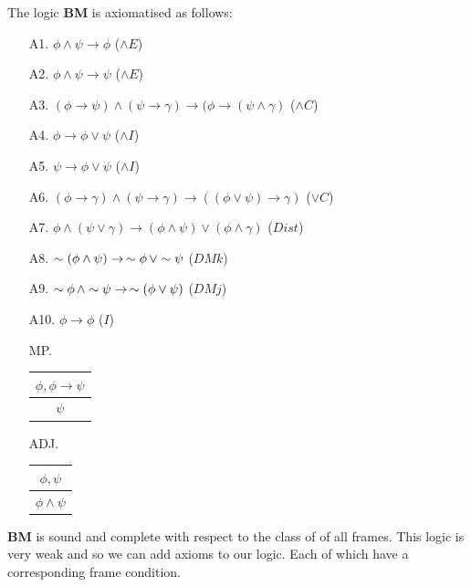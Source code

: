 \begin{definition}
    The logic \textbf{BM} is axiomatised as follows:
    \begin{enumerate}
        \item[A1.] $\phi \wedge \psi \to \phi$ \hfill ($\wedge E$)
        \item[A2.] $\phi \wedge \psi \to \psi$ \hfill ($\wedge E$)
        \item[A3.] $(\phi \to \psi) \wedge (\psi \to \gamma) \to (\phi \to (\psi\wedge\gamma)$ \hfill ($\wedge C$)
        \item[A4.] $\phi\to \phi\vee\psi$ \hfill ($\wedge I$)
        \item[A5.] $\psi\to \phi\vee\psi$ \hfill ($\wedge I$)
        \item[A6.] $(\phi \to \gamma) \wedge (\psi \to \gamma) \to ((\phi \vee \psi)\to\gamma)$ \hfill ($\vee C$)
        \item[A7.] $\phi\wedge(\psi\vee\gamma) \to (\phi\wedge\psi)\vee(\phi\wedge\gamma)$ \hfill ($Dist$)
        \item[A8.] $\sim(\phi\wedge\psi) \to \,\sim\phi\,\vee\sim\psi$ \hfill ($DMk$)
        \item[A9.] $\sim\phi\,\wedge\sim\psi \to \,\sim(\phi\vee\psi)$ \hfill ($DMj$)
        \item[A10.] $\phi\to\phi$ \hfill ($I$)
        \item[MP.]
        \begin{tabular}{c}
             $\phi , \phi \to \psi$\\
             \hline
             $\psi$
        \end{tabular}
        \item[ADJ.]
        \begin{tabular}{c}
             $\phi , \psi$\\
             \hline
             $\phi\wedge\psi$
        \end{tabular}
    \end{enumerate}
\end{definition}

\par \textbf{BM} is sound and complete with respect to the class of  of all frames. This logic is very weak and so we can add axioms to our logic. Each of which have a corresponding frame condition.



